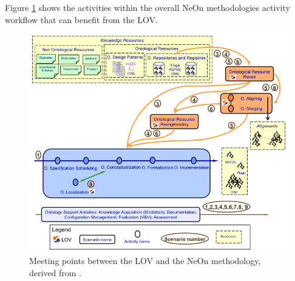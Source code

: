 \documentclass{iosart2c}
\begin{document}
\begin{description}
		
%							
%   
   
\end{description}

Figure \ref{fig:LOVandNeOn} shows the activities within the overall NeOn methodologies activity workflow that can benefit from the LOV.
\begin{figure}[h!tp]
\centering
  \includegraphics[width=1\linewidth]{neonScenarios.png}
  \caption{Meeting points between the LOV and the NeOn methodology, derived from \cite{MC10}.}
  \label{fig:LOVandNeOn}
\end{figure}
\end{document}
